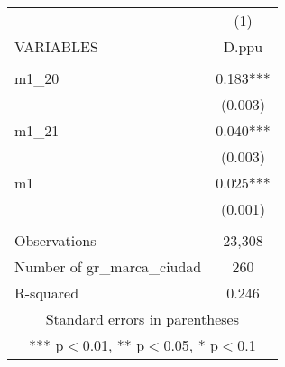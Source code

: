\begin{tabular}{lc} \hline
 & (1) \\
VARIABLES & D.ppu \\ \hline
 &  \\
m1\_20 & 0.183*** \\
 & (0.003) \\
m1\_21 & 0.040*** \\
 & (0.003) \\
m1 & 0.025*** \\
 & (0.001) \\
 &  \\
Observations & 23,308 \\
Number of gr\_marca\_ciudad & 260 \\
 R-squared & 0.246 \\ \hline
\multicolumn{2}{c}{ Standard errors in parentheses} \\
\multicolumn{2}{c}{ *** p$<$0.01, ** p$<$0.05, * p$<$0.1} \\
\end{tabular}
